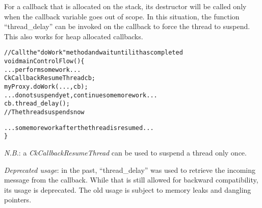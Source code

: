 For a callback that is allocated on the stack, its destructor will be called only
when the callback variable goes out of scope. In this
situation, the function ``thread\_delay'' can be invoked on the callback to
force the thread to suspend. This also works for heap allocated callbacks.

\begin{alltt}
// Call the "doWork" method and wait until it has completed
void mainControlFlow() \{
  ...perform some work...
  CkCallbackResumeThread cb;
  myProxy.doWork(...,cb);
  ...do not suspend yet, continue some more work...
  cb.thread\_delay();
  // The thread suspends now

  ...some more work after the thread is resumed...
\}
\end{alltt}

{\em N.B.}: a {\em CkCallbackResumeThread} can be used to suspend a thread
only once.

{\em Deprecated usage}: in the past, ``thread\_delay'' was used to retrieve the
incoming message from the callback. While that is still allowed for backward
compatibility, its usage is deprecated. The old usage is subject to memory
leaks and dangling pointers.

